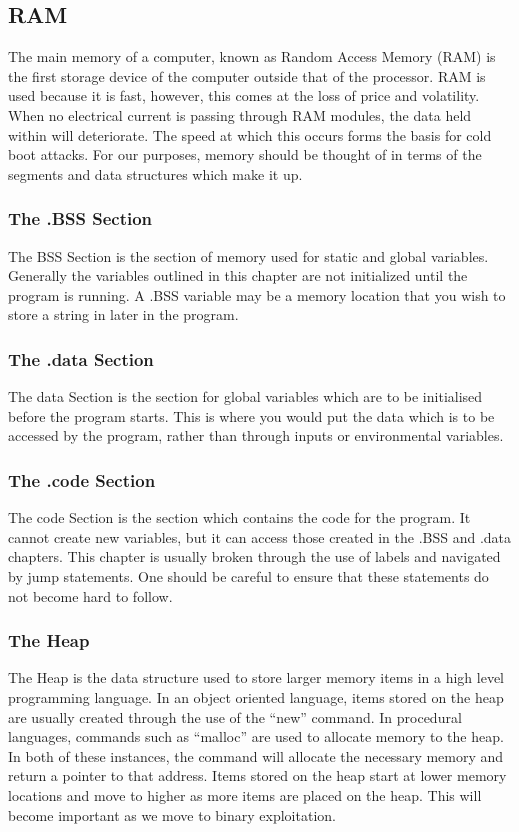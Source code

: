 \documentclass[a4paper,11pt]{report}
\begin{document}
				\subsection{RAM}
					The main memory of a computer, known as Random Access Memory (RAM) is the first storage device of the computer outside that of the processor. 
					RAM is used because it is fast, however, this comes at the loss of price and volatility. 
					When no electrical current is passing through RAM modules, the data held within will deteriorate. 
					The speed at which this occurs forms the basis for cold boot attacks. %
					For our purposes, memory should be thought of in terms of the segments and data structures which make it up. 
					\subsubsection{The .BSS Section}
						The BSS Section is the section of memory used for static and global variables. 
						Generally the variables outlined in this chapter are not initialized until the program is running. 
						A .BSS variable may be a memory location that you wish to store a string in later in the program. 
					\subsubsection{The .data Section}
						The data Section is the section for global variables which are to be initialised before the program starts. 
						This is where you would put the data which is to be accessed by the program, rather than through inputs or environmental variables. 
					\subsubsection{The .code Section}
						The code Section is the section which contains the code for the program. 
						It cannot create new variables, but it can access those created in the .BSS and .data chapters. 
						This chapter is usually broken through the use of labels and navigated by jump statements. 
						One should be careful to ensure that these statements do not become hard to follow. 
					\subsubsection{The Heap}
						The Heap is the data structure used to store larger memory items in a high level programming language. 
						In an object oriented language, items stored on the heap are usually created through the use of the ``new'' command. 
						In procedural languages, commands such as ``malloc'' are used to allocate memory to the heap. 
						In both of these instances, the command will allocate the necessary memory and return a pointer to that address. 
						Items stored on the heap start at lower memory locations and move to higher as more items are placed on the heap. 
						This will become important as we move to binary exploitation. 
\end{document}
